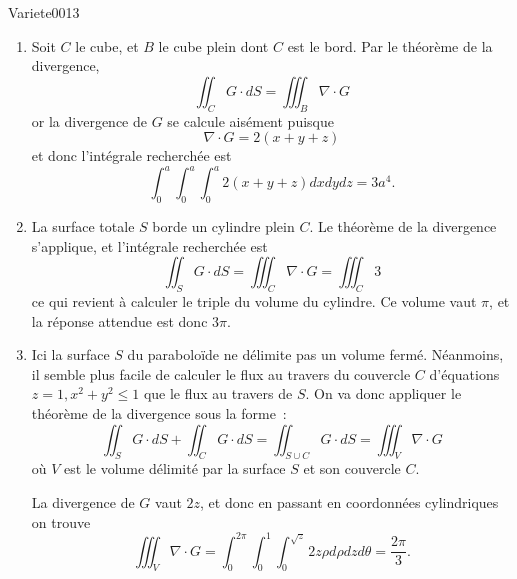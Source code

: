 
\begin{corrige}{Variete0013}



\begin{enumerate}
\item Soit $C$ le cube, et $B$ le cube plein dont $C$ est le bord. Par
  le théorème de la divergence,
  \begin{equation*}
    \iint_C G\cdot d S = \iiint_B \nabla\cdot G
  \end{equation*}
  or la divergence de $G$ se calcule aisément puisque
  \begin{equation*}
    \nabla\cdot G = 2(x+y+z)
  \end{equation*}
  et donc l'intégrale recherchée est
  \begin{equation*}
    \int_0^a \int_0^a \int_0^a 2 (x+y+z) d xd y d z= 3 a^4.
  \end{equation*}
\item La surface totale $S$ borde un cylindre plein $C$. Le théorème
  de la divergence s'applique, et l'intégrale recherchée est
  \begin{equation*}
    \iint_S G \cdot d S = \iiint_C \nabla\cdot G = \iiint_C 3
  \end{equation*}
  ce qui revient à calculer le triple du volume du cylindre. Ce volume vaut
  $\pi$, et la réponse attendue est donc $3\pi$.

\item Ici la surface $S$ du paraboloïde ne délimite pas un volume
  fermé. Néanmoins, il semble plus facile de calculer le flux au
  travers du \og couvercle\fg{} $C$ d'équations $z = 1, x^2 + y^2 \leq 1$ que le flux au
  travers de $S$. On va donc appliquer le théorème de la divergence
  sous la forme~:
  \begin{equation*}
    \iint_S G \cdot d S + \iint_C G \cdot d S = \iint_{S \cup C} G \cdot d S =
    \iiint_V \nabla\cdot G
  \end{equation*}
  où $V$ est le volume délimité par la surface $S$ et son couvercle
  $C$.

  La divergence de $G$ vaut $2 z$, et donc en passant en coordonnées
  cylindriques on trouve
  \begin{equation*}
    \iiint_V \nabla\cdot G = \int_0^{2\pi}\int_0^1 \int_0^{\sqrt z} 2 z \rho d \rho
    d z d \theta = \frac{2 \pi}{3}.
  \end{equation*}


\end{enumerate}
\end{corrige}
